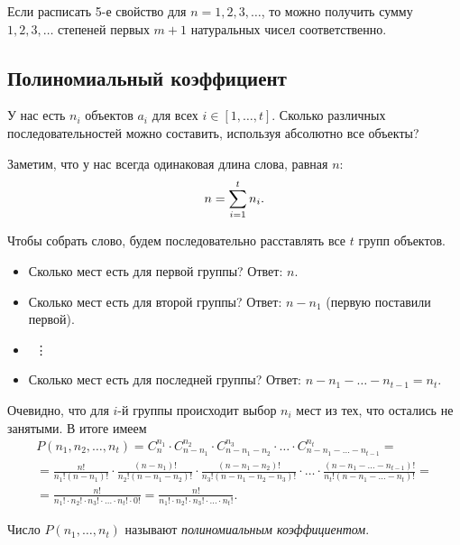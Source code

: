 \begin{note}
	Если расписать 5-е свойство для $n = 1, 2, 3, \ldots$, то можно получить сумму $1, 2, 3, \ldots$ степеней первых $m + 1$ натуральных чисел соответственно.
\end{note}

\subsection{Полиномиальный коэффициент}

У нас есть $n_i$ объектов $a_i$ для всех $i \in [1, \ldots, t]$. Сколько различных последовательностей можно составить, используя абсолютно все объекты?

Заметим, что у нас всегда одинаковая длина слова, равная $n$:
\[
	n = \sum\limits_{i = 1}^t n_i.
\]

Чтобы собрать слово, будем последовательно расставлять все $t$ групп объектов.
\begin{itemize}
	\item Сколько мест есть для первой группы? Ответ: $n$.
	\item Сколько мест есть для второй группы? Ответ: $n - n_1$ (первую поставили первой).
	
	\item~\vdots
	\item Сколько мест есть для последней группы? Ответ: $n - n_1 - \ldots - n_{t - 1} = n_t$.
\end{itemize}

Очевидно, что для $i$-й группы происходит выбор $n_i$ мест из тех, что остались не занятыми. В итоге имеем
\begin{multline*}
	P(n_1, n_2, \ldots, n_t) = C_n^{n_1} \cdot C_{n - n_1}^{n_2} \cdot C_{n - n_1 - n_2}^{n_3} \cdot \ldots \cdot C_{n - n_1 - \ldots - n_{t - 1}}^{n_t} = \\ =
	\frac{n!}{n_1! (n - n_1)!} \cdot \frac{(n - n_1)!}{n_2! (n - n_1 - n_2)!} \cdot \frac{(n - n_1 - n_2)!}{n_3! (n - n_1 - n_2 - n_3)!} \cdot \ldots \cdot \frac{(n - n_1 - \ldots - n_{t - 1})!}{n_t! (n - n_1 - \ldots - n_t)!} = \\ =
	\frac{n!}{n_1! \cdot n_2! \cdot n_3! \cdot \ldots \cdot n_t! \cdot 0!} = \frac{n!}{n_1! \cdot n_2! \cdot n_3! \cdot \ldots \cdot n_t!}.
\end{multline*}

\begin{definition}
	Число $P(n_1, \ldots, n_t)$ называют \textit{полиномиальным коэффициентом}.
\end{definition}

